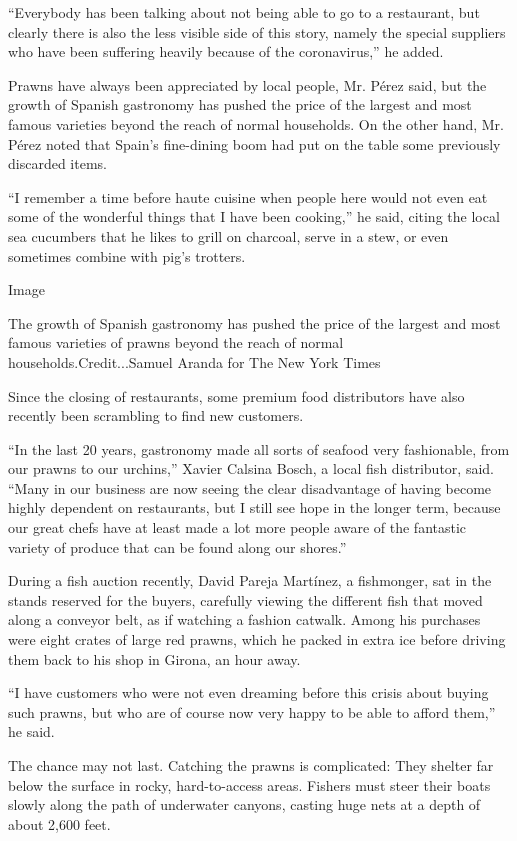 ``Everybody has been talking about not being able to go to a restaurant,
but clearly there is also the less visible side of this story, namely
the special suppliers who have been suffering heavily because of the
coronavirus,'' he added.

Prawns have always been appreciated by local people, Mr. Pérez said, but
the growth of Spanish gastronomy has pushed the price of the largest and
most famous varieties beyond the reach of normal households. On the
other hand, Mr. Pérez noted that Spain's fine-dining boom had put on the
table some previously discarded items.

``I remember a time before haute cuisine when people here would not even
eat some of the wonderful things that I have been cooking,'' he said,
citing the local sea cucumbers that he likes to grill on charcoal, serve
in a stew, or even sometimes combine with pig's trotters.

Image

The growth of Spanish gastronomy has pushed the price of the largest and
most famous varieties of prawns beyond the reach of normal
households.Credit...Samuel Aranda for The New York Times

Since the closing of restaurants, some premium food distributors have
also recently been scrambling to find new customers.

``In the last 20 years, gastronomy made all sorts of seafood very
fashionable, from our prawns to our urchins,'' Xavier Calsina Bosch, a
local fish distributor, said. ``Many in our business are now seeing the
clear disadvantage of having become highly dependent on restaurants, but
I still see hope in the longer term, because our great chefs have at
least made a lot more people aware of the fantastic variety of produce
that can be found along our shores.''

During a fish auction recently, David Pareja Martínez, a fishmonger, sat
in the stands reserved for the buyers, carefully viewing the different
fish that moved along a conveyor belt, as if watching a fashion catwalk.
Among his purchases were eight crates of large red prawns, which he
packed in extra ice before driving them back to his shop in Girona, an
hour away.

``I have customers who were not even dreaming before this crisis about
buying such prawns, but who are of course now very happy to be able to
afford them,'' he said.

The chance may not last. Catching the prawns is complicated: They
shelter far below the surface in rocky, hard-to-access areas. Fishers
must steer their boats slowly along the path of underwater canyons,
casting huge nets at a depth of about 2,600 feet.

